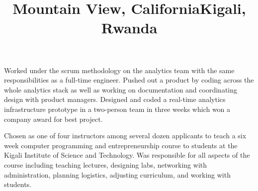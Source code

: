 \begin{resume}
\title{Mountain View, California}
\begin{position}
Worked under the scrum methodology on the analytics team with the same responsibilities as a full-time engineer. Pushed out a product by coding across the whole analytics stack as well as working on documentation and coordinating design with product managers. Designed and coded a real-time analytics infrastructure prototype in a two-person team in three weeks which won a company award for best project.
\end{position}

\title{Kigali, Rwanda}
\begin{position}
Chosen as one of four instructors among several dozen applicants to teach a six week computer programming and entrepreneurship course to students at the Kigali Institute of Science and Technology. Was responsible for all aspects of the course including teaching lectures, designing labs, networking with administration, planning logistics, adjusting curriculum, and working with students.\end{position}

%   


%


\end{resume}
